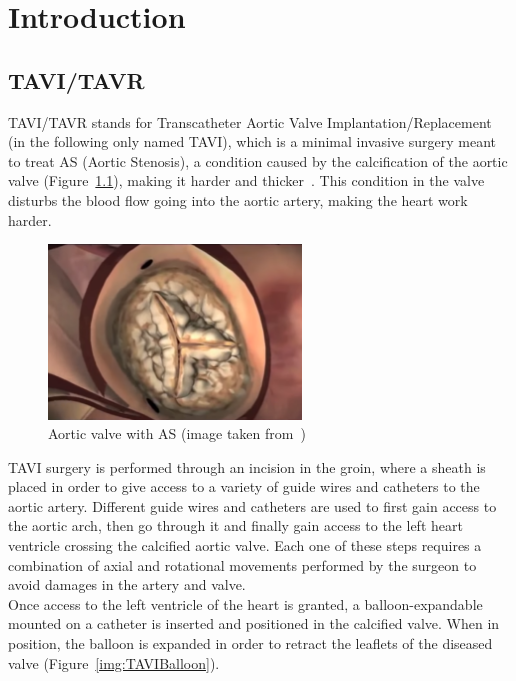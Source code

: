 
\chapter{Introduction}\label{sec:introduction}

\section{TAVI/TAVR}\label{sec:tavi}

TAVI/TAVR stands for Transcatheter Aortic Valve Implantation/Replacement (in the following only named TAVI), which is a minimal invasive surgery meant to treat AS (Aortic Stenosis), a condition caused by the calcification of the aortic valve (Figure~\ref{img:TAVICalValve}), making it harder and thicker~\cite{tavi2013}. This condition in the valve disturbs the blood flow going into the aortic artery, making the heart work harder.\\

\begin{figure}[ht]
   \centering
   \includegraphics[width=0.6\textwidth]{img/TAVICalValve.PNG}
   \caption{Aortic valve with AS (image taken from~\protect\cite{tavivideo})}
   \label{img:TAVICalValve}
\end{figure}

TAVI surgery is performed through an incision in the groin, where a sheath is placed in order to give access to a variety of guide wires and catheters to the aortic artery. Different guide wires and catheters are used to first gain access to the aortic arch, then go through it and finally gain access to the left heart ventricle crossing the calcified aortic valve. Each one of these steps requires a combination of axial and rotational movements performed by the surgeon to avoid damages in the artery and valve.\\

Once access to the left ventricle of the heart is granted, a balloon-expandable mounted on a catheter is inserted and positioned in the calcified valve. When in position, the balloon is expanded in order to retract the leaflets of the diseased valve (Figure~\ref{img:TAVIBalloon}).\\

